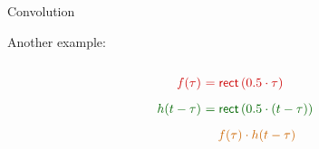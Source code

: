 \begin{frame}[t]{Convolution}

    Another example:
    \vspace{0.2cm}

    \begin{center}
        \begin{columns}[t, onlytextwidth]
            \begin{column}{0.5\textwidth}
                \centering{}
                \only<1>{\scalebox{0.5}{}}%
                \begin{align*}
                    \textcolor{red!80!black}{f(\tau)~}     & \textcolor{red!80!black}{= \mathsf{rect}\left(0.5\cdot \tau \right)}                 \\[0.2cm]
                    \textcolor{green!40!black}{h(t-\tau)~} & \textcolor{green!40!black}{= \mathsf{rect}\left(0.5\cdot \left(t-\tau\right)\right)} \\[0.2cm]
                                                           & \textcolor{orange!80!black}{~~~f(\tau) \cdot h(t-\tau)}                              \\[0.2cm]
                \end{align*}



\end{column}
\end{columns}
\end{center}
\end{frame}
